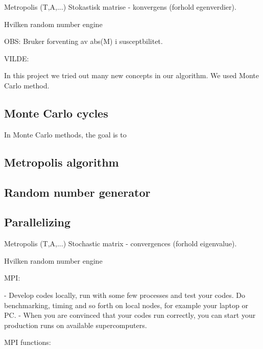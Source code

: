 
Metropolis (T,A,...)
	Stokastisk matrise  - konvergens (forhold egenverdier).
	
	Hvilken random number engine

	OBS: Bruker forventing av abs(M) i susceptbilitet. 



VILDE: 



In this project we tried out many new concepts in our algorithm. We used Monte Carlo method. 


\subsection{Monte Carlo cycles}

In Monte Carlo methods, the goal is to 





\subsection{Metropolis algorithm}

\subsection{Random number generator}

\subsection{Parallelizing}



Metropolis (T,A,...)
Stochastic matrix  - convergences (forhold eigenvalue).

Hvilken random number engine

MPI:	

- Develop codes locally, run with some few processes and test your codes. Do benchmarking, timing and so forth on local nodes, for example your laptop or PC.
- When you are convinced that your codes run correctly, you can start your production runs on available supercomputers.


MPI functions:
%
%
%
%
%
%
%
